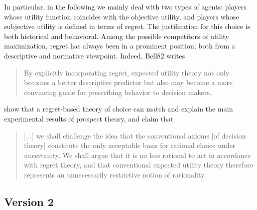 \documentclass[fleqn,reqno,11pt]{article}
\begin{document}
In particular, in the following we mainly deal with two types of agents: players whose utility
function coincides with the objective utility, and players whose subjective utility is defined
in terms of regret. The justification for this choice is both historical and behavioral. Among
the possible competitors of utility maximization, regret has always been in a prominent
position, both from a descriptive and normative viewpoint. Indeed, Bell82 writes
\begin{quote}
  By explicitly incorporating regret, expected utility theory not only becomes a better
  descriptive predictor but also may become a more convincing guide for prescribing behavior to
  decision makers.
\end{quote}
\citet{LoomesSugden1982:Regret-Theory:-} show that a regret-based theory of choice can match
and explain the main experimental results of prospect theory, and claim that
\begin{quote} [...] we shall challenge the idea that the conventional axioms [of decision
  theory] constitute the only acceptable basis for rational choice under uncertainty. We shall
  argue that it is no less rational to act in accordance with regret theory, and that
  conventional expected utility theory therefore represents an unnecessarily restrictive notion
  of rationality. \hfill \citep{LoomesSugden1982:Regret-Theory:-}
\end{quote}







\subsection{Version 2}
\end{document}
